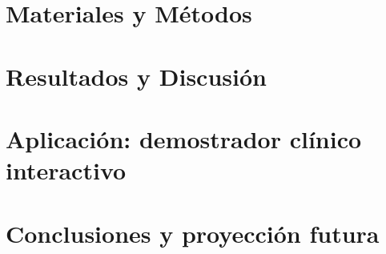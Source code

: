 \documentclass[twoside,spanish,a4paper,12pt]{tfg}
\begin{document}
\chapter{Materiales y Métodos}



\chapter{Resultados y Discusión}


\chapter{Aplicación: demostrador clínico interactivo}


\chapter{Conclusiones y proyección futura}





\end{document}
